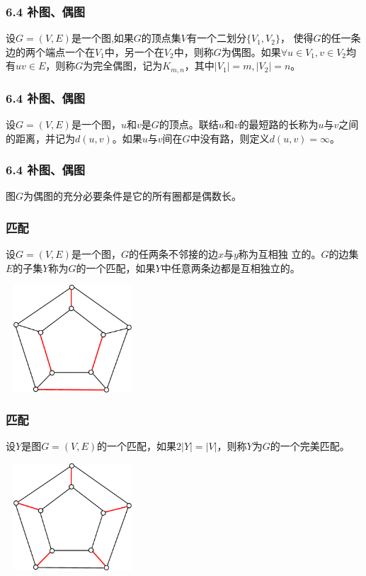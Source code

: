 \documentclass{beamer}
\begin{document}
\begin{CJK*}{UTF8}{gbsn}
\begin{frame}
  \frametitle{6.4 补图、偶图}
  \begin{definition6.4.2}
    设$G=(V,E)$是一个图,如果$G$的顶点集$V$有一个二划分$\{V_1,V_2\}$，
    使得$G$的任一条边的两个端点一个在$V_1$中，另一个在$V_2$中，则称$G$为\alert{偶图}。如果$\forall u \in V_1, v \in V_2$均有$uv \in E$，则称$G$为\alert{完全偶图}，记为$K_{m,n}$，其中$|V_1|=m,|V_2|=n$。
  \end{definition6.4.2}
\end{frame}

\begin{frame}
  \frametitle{6.4 补图、偶图}
  \begin{definition6.4.3}
    设$G=(V,E)$是一个图，$u$和$v$是$G$的顶点。联结$u$和$v$的最短路的长称为$u$与$v$之间的\alert{距离}，并记为$d(u,v)$。如果$u$与$v$间在$G$中没有路，则定义$d(u,v)=\infty$。
  \end{definition6.4.3}
\end{frame}

\begin{frame}
  \frametitle{6.4 补图、偶图}
  \begin{theorem6.4.2}
    图$G$为偶图的充分必要条件是它的所有圈都是偶数长。
  \end{theorem6.4.2}
\end{frame}

\begin{frame}
  \frametitle{匹配}
  \begin{definition6.4.4}
    设$G=(V,E)$是一个图，$G$的任两条不邻接的边$x$与$y$称为互相\alert{独
      立}的。$G$的边集$E$的子集$Y$称为$G$的一个\alert{匹配}，如果$Y$中任意两条边都是互相独立的。
  \end{definition6.4.4}
\pause
\centering
\includegraphics[width=5cm,height=4cm]{matching}
\end{frame}
\begin{frame}
  \frametitle{匹配}
  \begin{definition6.4.5}
    设$Y$是图$G=(V,E)$的一个匹配，如果$2|Y|=|V|$，则称$Y$为$G$的一个\alert{完美匹配}。
  \end{definition6.4.5}
\pause
\centering
\includegraphics[width=5cm,height=4cm]{perfect}
\end{frame}


\end{CJK*}
\end{document}
